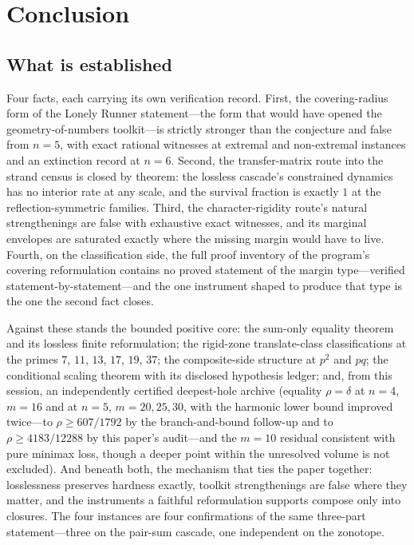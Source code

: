 
\section{Conclusion}\label{sec:concl}

\subsection{What is established}

Four facts, each carrying its own verification record. First, the
covering-radius form of the Lonely Runner statement---the form that
would have opened the geometry-of-numbers toolkit---is strictly stronger
than the conjecture and false from $n=5$, with exact rational witnesses
at extremal and non-extremal instances and an extinction record at
$n=6$. Second, the transfer-matrix route into the strand census is
closed by theorem: the lossless cascade's constrained dynamics has no
interior rate at any scale, and the survival fraction is exactly $1$ at
the reflection-symmetric families. Third, the character-rigidity route's
natural strengthenings are false with exhaustive exact witnesses, and
its marginal envelopes are saturated exactly where the missing margin
would have to live. Fourth, on the classification side, the full proof
inventory of the program's covering reformulation contains no proved
statement of the margin type---verified statement-by-statement---and the
one instrument shaped to produce that type is the one the second fact
closes.

Against these stands the bounded positive core: the sum-only equality
theorem and its lossless finite reformulation; the rigid-zone
translate-class classifications at the primes $7$, $11$, $13$, $17$,
$19$, $37$; the composite-side structure at $p^2$ and $pq$; the
conditional scaling theorem with its disclosed hypothesis ledger; and, from this session, an independently certified deepest-hole archive
(equality $\rho=\delta$ at $n=4$, $m=16$ and at $n=5$,
$m=20,25,30$, with the harmonic lower bound improved twice---to
$\rho\ge607/1792$ by the branch-and-bound follow-up and to
$\rho\ge4183/12288$ by this paper's audit---and the $m=10$ residual
consistent with pure minimax loss, though a deeper point within the
unresolved volume is not excluded). And
beneath both, the mechanism that ties the paper together: losslessness
preserves hardness exactly, toolkit strengthenings are false where they
matter, and the instruments a faithful reformulation supports compose
only into closures. The four instances are four confirmations of the
same three-part statement---three on the pair-sum cascade, one
independent on the zonotope.

